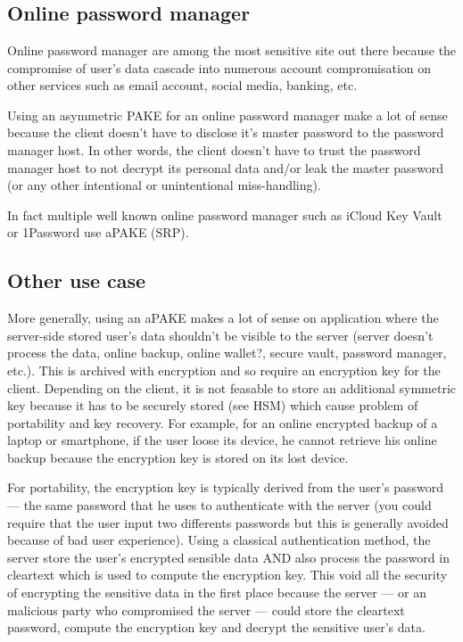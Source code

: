 \documentclass[../report.tex]{subfiles}
\begin{document}
\chapter{}
\label{cha:use_case}


\section{Online password manager}
Online password manager are among the most sensitive site out there because the compromise of user's data cascade into numerous account compromisation on other services such as email account, social media, banking, etc.

Using an asymmetric PAKE for an online password manager make a lot of sense because the client doesn't have to disclose it's master password to the password manager host. In other words, the client doesn't have to trust the password manager host to not decrypt its personal data and/or leak the master password (or any other intentional or unintentional miss-handling).

In fact multiple well known online password manager such as iCloud Key Vault or 1Password use aPAKE (SRP).

\section{Other use case}

More generally, using an aPAKE makes a lot of sense on application where the server-side stored user's data shouldn't be visible to the server (server doesn't process the data, online backup, online wallet?, secure vault, password manager, etc.). This is archived with encryption and so require an encryption key for the client.
Depending on the client, it is not feasable to store an additional symmetric key because it has to be securely stored (see HSM) which cause problem of portability and key recovery. For example, for an online encrypted backup of a laptop or smartphone, if the user loose its device, he cannot retrieve his online backup because the encryption key is stored on its lost device.

For portability, the encryption key is typically derived from the user's password --- the same password that he uses to authenticate with the server (you could require that the user input two differents passwords but this is generally avoided because of bad user experience). Using a classical authentication method, the server store the user's encrypted sensible data AND also process the password in cleartext which is used to compute the encryption key. This void all the security of encrypting the sensitive data in the first place because the server --- or an malicious party who compromised the server --- could store the cleartext password, compute the encryption key and decrypt the sensitive user's data.
\end{document}

